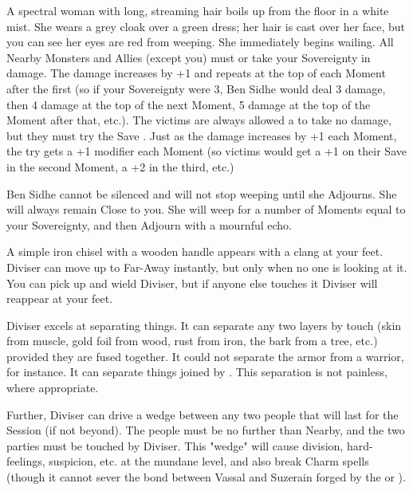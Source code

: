 A spectral woman with long, streaming hair boils up from the floor in a white mist.  She wears a grey cloak over a green dress; her hair is cast over her face, but you can see her eyes are red from weeping.  She immediately begins wailing.  All Nearby Monsters and Allies (except you) must or take your Sovereignty in damage.  The damage increases by +1 and repeats at the top of each Moment after the first (so if your Sovereignty were 3, Ben Sidhe would deal 3 damage, then 4 damage at the top of the next Moment, 5 damage at the top of the Moment after that, etc.).  The victims are always allowed a  to take no damage, but they must try the Save . Just as the damage increases by +1 each Moment, the  try gets a +1 modifier each Moment (so victims would get a +1 on their Save in the second Moment, a +2 in the third, etc.)

Ben Sidhe cannot be silenced and will not stop weeping until she Adjourns.  She will always remain Close to you. She will weep for a number of Moments equal to your Sovereignty, and then Adjourn with a mournful echo.



A simple iron chisel with a wooden handle appears with a clang at your feet. Diviser{\AccentE} can move up to Far-Away instantly, but only when no one is looking at it. You can pick up and wield Diviser{\AccentE}, but if anyone else touches it Diviser{\AccentE} will reappear at your feet.

Diviser{\AccentE} excels at separating things. It can separate any two layers by touch (skin from muscle, gold foil from wood, rust from iron, the bark from a tree, etc.) provided they are fused together. It could not separate the armor from a warrior, for instance. It can separate things joined by . This separation is not painless, where appropriate.

Further, Diviser{\AccentE} can drive a wedge between any two people that will last for the Session (if not beyond). The people must be no further than Nearby, and the two parties must be touched by Diviser{\AccentE}. This "wedge" will cause division, hard-feelings, suspicion, etc. at the mundane level, and also break Charm spells (though it cannot sever the bond between Vassal and Suzerain forged by the  or ). 

